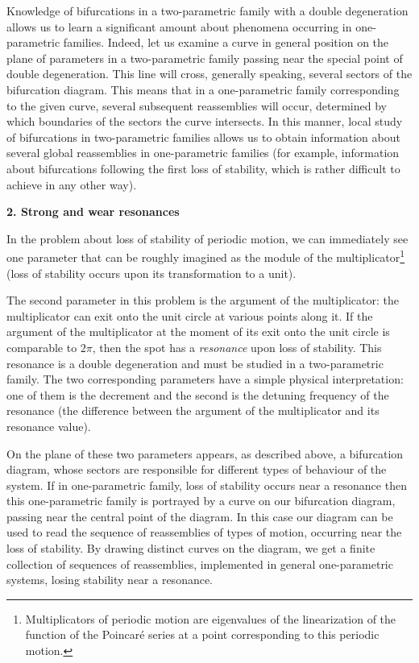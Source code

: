 \documentclass[12pt]{amsart}
\begin{document}
Knowledge of bifurcations in a two-parametric family with a double degeneration
allows us to learn a significant amount about phenomena occurring in
one-parametric families.
Indeed, let us examine a curve in general position on the plane of parameters
in a two-parametric family passing near the special point of double
degeneration.
This line will cross, generally speaking, several sectors of the bifurcation
diagram.
This means that in a one-parametric family corresponding to the given curve,
several subsequent reassemblies will occur, determined by which boundaries of
the sectors the curve intersects.
In this manner, local study of bifurcations in two-parametric families allows us
to obtain information about several global reassemblies in one-parametric
families (for example, information about bifurcations following the first loss
of stability, which is rather difficult to achieve in any other way).\\

\centerline{\textbf{2. Strong and wear resonances}}
\vspace{1em}
In the problem about loss of stability of periodic motion, we can immediately
see one parameter that can be roughly imagined as the module of the
multiplicator\footnote{Multiplicators of periodic motion are eigenvalues of the
linearization of the function of the Poincar\'e series at a point corresponding to
this periodic motion.} (loss of stability occurs upon its transformation to a
unit).

The second parameter in this problem is the argument of the multiplicator:
the multiplicator can exit onto the unit circle at various points along it.
If the argument of the multiplicator at the moment of its exit onto the unit
circle is comparable to $2\pi$, then the spot has a \textit{resonance} upon loss
of stability.
This resonance is a double degeneration and must be studied in a two-parametric
family.
The two corresponding parameters have a simple physical interpretation: one of
them is the decrement and the second is the detuning frequency of the resonance
(the difference between the argument of the multiplicator and its resonance
value).

On the plane of these two parameters appears, as described above, a bifurcation
diagram, whose sectors are responsible for different types of behaviour of the
system.
If in one-parametric family, loss of stability occurs near a resonance then this
one-parametric family is portrayed by a curve on our bifurcation diagram,
passing near the central point of the diagram.
In this case our diagram can be used to read the sequence of reassemblies of
types of motion, occurring near the loss of stability.
By drawing distinct curves on the diagram, we get a finite collection of
sequences of reassemblies, implemented in general one-parametric systems, losing
stability near a resonance.
\end{document}

